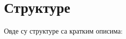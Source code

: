 \section{Структуре}
Овде су структуре са кратким описима\+:\begin{DoxyCompactList}
\item{}
\end{DoxyCompactList}
